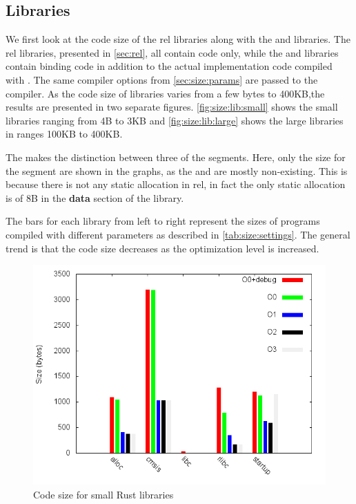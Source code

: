 \subsection{Libraries}

We first look at the code size of the \gls{rel} libraries along with the  and  libraries.
The \gls{rel} libraries, presented in \autoref{sec:rel}, all contain {\rust} code only, while the  and  libraries contain {\rust} binding code in addition to the actual {\C} implementation code compiled with .
The same compiler options from \autoref{sec:size:params} are passed to the {\C} compiler.
As the code size of libraries varies from a few bytes to 400KB,the results are presented in two separate figures.
\autoref{fig:size:lib:small} shows the small libraries ranging from 4B to 3KB and \autoref{fig:size:lib:large} shows the large libraries in ranges 100KB to 400KB.

The  makes the distinction between three of the {\elf} segments.
Here, only the size for the  segment are shown in the graphs, as the  and  are mostly non-existing.
This is because there is not any static allocation in \gls{rel}, in fact the only static allocation is of 8B in the \textbf{data} section of the  library.

The bars for each library from left to right represent the sizes of programs compiled with different parameters as described in \autoref{tab:size:settings}.
The general trend is that the code size decreases as the optimization level is increased.

\begin{figure}[H]
  \begin{center}
    \includegraphics[scale=0.5]{results/plots/size/lib/small/size.png}
  \end{center}
  \caption{Code size for small Rust libraries}
  \label{fig:size:lib:small}
\end{figure}

